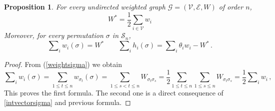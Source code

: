 \documentclass[12pt,twoside,reqno]{amsart}
\newtheorem{proposition}[theorem]{Proposition}
\theoremstyle{definition}
\numberwithin{equation}{section}
\newcommand{\be}{\begin{equation}}
\newcommand{\ee}{\end{equation}}
\newcommand{\mc}{\mathcal}
\newcommand{\0}{\mathbf{0}}
\newcommand{\1}{\mathbf{1}}
\newcommand{\infl}{h}
\newcommand{\thre}{\theta}
\newcommand{\we}{W^*}
\begin{document}
{\begin{proposition}\label{lemma:equalize} For every undirected weighted graph $\mc G=(\mc V, \mc E, W)$ of order $n$,
$$\we = \frac{1}{2}\sum\limits_{i\in\mc V}w_i$$
Moreover, 
for every permutation $\sigma$ in $\mc S_{n}$,  
\be\label{equalize}\sum\nolimits_{i} w_i(\sigma)=\we \qquad  \sum\nolimits_{i} h_i(\sigma)=\sum\nolimits_{i}\thre_iw_i- \we
\,.\ee
\end{proposition}
\begin{proof}
From (\ref{weightsigma}) we obtain
$$\sum\nolimits_{i} w_i(\sigma)=\sum\limits_{1\le t\le n} w_{\sigma_t}(\sigma)
=\sum\limits_{1\le s<t\le n}W_{\sigma_t\sigma_s}
=\frac{1}{2}\sum\limits_{1\le t\le n}\sum\limits_{1\le s\le n}W_{\sigma_t\sigma_s}=\frac{1}{2}\sum\nolimits_{i}w_i\,,$$
This proves the first formula. The second one is a direct consequence of \eqref{intvectorsigma} and previous formula.
\end{proof}

}
\end{document}
